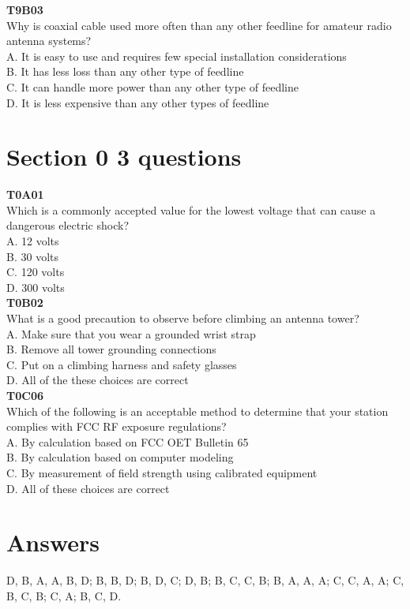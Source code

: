 \documentclass[12pt,letterpaper,twocolumn]{report}
\begin{document}
\textbf{T9B03}\\
Why is coaxial cable used more often than any other feedline for amateur radio antenna systems?\\
A. It is easy to use and requires few special installation considerations\\
B. It has less loss than any other type of feedline\\
C. It can handle more power than any other type of feedline\\
D. It is less expensive than any other types of feedline\\


\section{Section 0 3 questions}

\textbf{T0A01}\\
Which is a commonly accepted value for the lowest voltage that can cause a dangerous electric shock?\\
A. 12 volts\\
B. 30 volts\\
C. 120 volts\\
D. 300 volts\\

\textbf{T0B02}\\
What is a good precaution to observe before climbing an antenna tower?\\
A. Make sure that you wear a grounded wrist strap\\
B. Remove all tower grounding connections\\
C. Put on a climbing harness and safety glasses\\
D. All of the these choices are correct\\

\textbf{T0C06}\\
Which of the following is an acceptable method to determine that your station complies with FCC RF exposure regulations?\\
A. By calculation based on FCC OET Bulletin 65\\
B. By calculation based on computer modeling\\
C. By measurement of field strength using calibrated equipment\\
D. All of these choices are correct\\

\newpage
\onecolumn
\section{Answers}
D, B, A, A, B, D; B, B, D; B, D, C; D, B; B, C, C, B; B, A, A, A; C, C, A, A; C, B, C, B; C, A; B, C, D.
\end{document}

